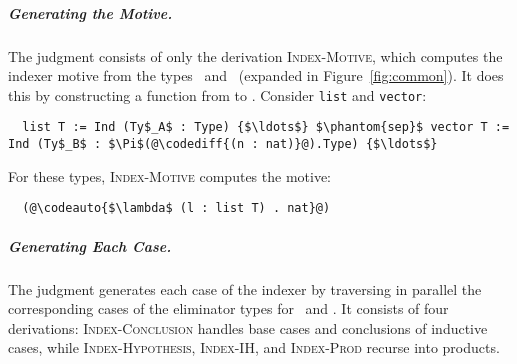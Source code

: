 \subparagraph*{Generating the Motive.}
The  judgment consists of only the derivation \textsc{Index-Motive},
which computes the indexer motive from the types \Aa\ and \AI\ (expanded in Figure~\ref{fig:common}).
It does this by constructing a function from \Aa to \I.
Consider \lstinline{list} and \lstinline{vector}:
\begin{lstlisting}
  list T := Ind (Ty$_A$ : Type) {$\ldots$} $\phantom{sep}$ vector T := Ind (Ty$_B$ : $\Pi$(@\codediff{(n : nat)}@).Type) {$\ldots$}
\end{lstlisting}
For these types, \textsc{Index-Motive} computes the motive:
\begin{lstlisting}
  (@\codeauto{$\lambda$ (l : list T) . nat}@)
\end{lstlisting} 

\subparagraph*{Generating Each Case.}
The  judgment generates each case of the indexer
by traversing in parallel the corresponding cases of the eliminator types for \Aa\ and \AI.
It consists of four derivations:
\textsc{Index-Conclusion} handles base cases and conclusions of inductive cases,
while \textsc{Index-Hypothesis}, \textsc{Index-IH}, and \textsc{Index-Prod} recurse into
products.

